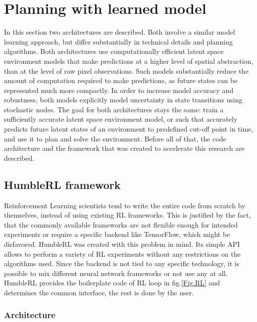 \section{Planning with learned model}

In this section two architectures are described. Both involve a similar model learning approach, but differ substantially in technical details and planning algorithms. Both architectures use computationally efficient latent space environment models that make predictions at a higher level of spatial abstraction, than at the level of raw pixel observations. Such models substantially reduce the amount of computation required to make predictions, as future states can be represented much more compactly. In order to increase model accuracy and robustness, both models explicitly model uncertainty in state transitions using stochastic nodes. \cite{Algo.FastGenerativeModels}
The goal for both architectures stays the same: train a sufficiently accurate latent space environment model, or such that accurately predicts future latent states of an environment to predefined cut-off point in time, and use it to plan and solve the environment. 
Before all of that, the code architecture and the framework that was created to accelerate this research are described.

\subsection{HumbleRL framework}

Reinforcement Learning scientists tend to write the entire code from scratch by themselves, instead of using existing RL frameworks. This is justified by the fact, that the commonly available frameworks are not flexible enough for intended experiments or require a specific backend like TensorFlow, which might be disfavored.
HumbleRL \cite{Code.HRL} was created with this problem in mind. Its simple API allows to perform a variety of RL experiments without any restrictions on the algorithms used. Since the backend is not tied to any specific technology, it is possible to mix different neural network frameworks or not use any at all. HumbleRL provides the boilerplate code of RL loop in fig.\ref{Fig.RL} and determines the common interface, the rest is done by the user.

\subsubsection{Architecture}

